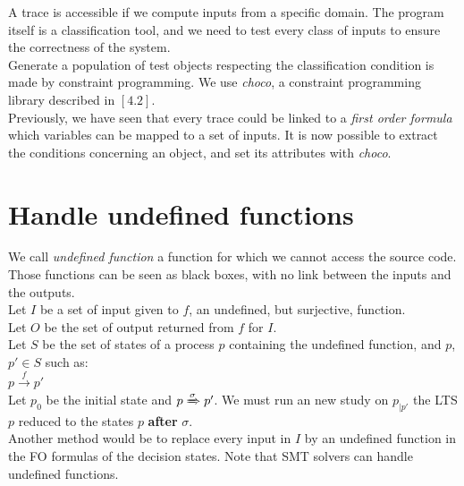 \documentclass[a4paper]{report}
\begin{document}
A trace is accessible if we compute inputs from a specific domain. The program itself is a classification tool, and we need to test every class of inputs to ensure the correctness of the system.\\

Generate a population of test objects respecting the classification condition is made by constraint programming. We use \textit{choco}, a constraint programming library described in $[4.2]$.\\

Previously, we have seen that every trace could be linked to a \textit{first order formula} which variables can be mapped to a set of inputs. It is now possible to extract the conditions concerning an object, and set its attributes with \textit{choco}.\\


\section*{Handle undefined functions}
We call \textit{undefined function} a function for which we cannot access the source code. Those functions can be seen as black boxes, with no link between the inputs and the outputs.\\
Let $I$ be a set of input given to $f$, an undefined, but surjective, function.\\
Let $O$ be the set of output returned from $f$ for $I$.\\
Let $S$ be the set of states of a process $p$ containing the undefined function, and $p$, $p' \in S$ such as:\\
$p \xrightarrow{f} p'$\\
Let $p_0$ be the initial state and $p \xRightarrow{\sigma} p'$.
We must run an new study on $p_{\mid p'}$ the LTS $p$ reduced to the states $p$ \textbf{after} $\sigma$.\\
 Another method would be to replace every input in $I$ by an undefined function in the FO formulas of the decision states. Note that SMT solvers can handle undefined functions.\\


\end{document}
